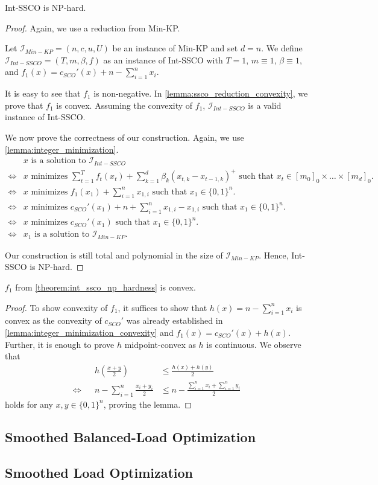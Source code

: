 \begin{theorem}
\label{theorem:int_ssco_np_hardness}
Int-SSCO is NP-hard.
\end{theorem}
\begin{proof}
Again, we use a reduction from Min-KP.

Let $\mathcal{I}_{Min-KP} = (n, c, u, U)$ be an instance of Min-KP and set $d = n$. We define $\mathcal{I}_{Int-SSCO} = (T, m, \beta, f)$ as an instance of Int-SSCO with $T = 1$, $m \equiv 1$, $\beta \equiv 1$, and $f_1(x) = c_{SCO}'(x) + n - \sum_{i=1}^n x_i$.

It is easy to see that $f_1$ is non-negative. In \autoref{lemma:ssco_reduction_convexity}, we prove that $f_1$ is convex. Assuming the convexity of $f_1$, $\mathcal{I}_{Int-SSCO}$ is a valid instance of Int-SSCO.

We now prove the correctness of our construction. Again, we use \autoref{lemma:integer_minimization}. \begin{align*}
         &x \text{ is a solution to } \mathcal{I}_{Int-SSCO} \\
    \iff &x \text{ minimizes } \sum_{t=1}^T f_t(x_t) + \sum_{k=1}^d \beta_k (x_{t,k} - x_{t-1,k})^+ \text{ such that } x_t \in [m_0]_0 \times \dots \times [m_d]_0. \\
    \iff &x \text{ minimizes } f_1(x_1) + \sum_{i=1}^n x_{1,i} \text{ such that } x_1 \in \{0,1\}^n. \\
    \iff &x \text{ minimizes } c_{SCO}'(x_1) + n + \sum_{i=1}^n x_{1,i} - x_{1,i} \text{ such that } x_1 \in \{0,1\}^n. \\
    \iff &x \text{ minimizes } c_{SCO}'(x_1) \text{ such that } x_1 \in \{0,1\}^n. \\
    \iff &x_1 \text{ is a solution to } \mathcal{I}_{Min-KP}.
\end{align*}

Our construction is still total and polynomial in the size of $\mathcal{I}_{Min-KP}$. Hence, Int-SSCO is NP-hard.
\end{proof}

\begin{lemma}
\label{lemma:ssco_reduction_convexity}
$f_1$ from \autoref{theorem:int_ssco_np_hardness} is convex.
\end{lemma}
\begin{proof}
To show convexity of $f_1$, it suffices to show that $h(x) = n - \sum_{i=1}^n x_i$ is convex as the convexity of $c_{SCO}'$ was already established in \autoref{lemma:integer_minimization_convexity} and $f_1(x) = c_{SCO}'(x) + h(x)$. Further, it is enough to prove $h$ midpoint-convex as $h$ is continuous. We observe that \begin{align*}
         &&h(\frac{x + y}{2}) &\leq \frac{h(x) + h(y)}{2} \\
    \iff &&n - \sum_{i=1}^n \frac{x_i + y_i}{2} &\leq n - \frac{\sum_{i=1}^n x_i + \sum_{i=1}^n y_i}{2}
\end{align*} holds for any $x, y \in \{0,1\}^n$, proving the lemma.
\end{proof}

\subsection{Smoothed Balanced-Load Optimization}

\subsection{Smoothed Load Optimization}
